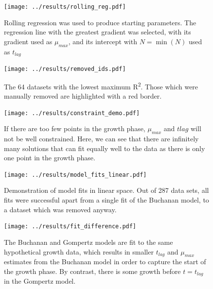 \documentclass[11pt, a4paper]{article}
\begin{document}
        
        \begin{figure}[H]
        \centering
        \texttt{[image: ../results/rolling\_reg.pdf]}
        \caption{Rolling regression was used to produce starting parameters. The regression line with the greatest gradient was selected, with its gradient used as $\mu_{max}$, and its intercept with $N = \min(N)$ used as $t_{lag}$ }
        \label{sup:rolling_regression}
        \end{figure}  
        
        
         \begin{figure}[H]
        \texttt{[image: ../results/removed\_ids.pdf]}
        \caption{The 64 datasets with the lowest maximum R\textsuperscript{2}. Those which were manually removed are highlighted with a red border.}
        \label{sup:removed_ids}
        \end{figure}
        
                 \begin{figure}[H]
        \texttt{[image: ../results/constraint\_demo.pdf]}
        \centering
        \caption{If there are too few points in the growth phase, $\mu_{max}$ and $t{lag}$ will not be well constrained. Here, we can see that there are infinitely many solutions that can fit equally well to the data as there is only one point in the growth phase. }
        \label{sup:constraint}
        \end{figure}  


                \begin{figure}[H]
                \centering
        \texttt{[image: ../results/model\_fits\_linear.pdf]}
        \caption{Demonstration of model fits in linear space. Out of 287 data sets, all fits were successful apart from a single fit of the Buchanan model, to a dataset which was removed anyway.}
        \label{sup:model_fits_linear}
        \end{figure}

         \begin{figure}[H]
        \texttt{[image: ../results/fit\_difference.pdf]}
        \centering
        \caption{The Buchanan and Gompertz models are fit to the same hypothetical growth data, which results in smaller $t_{lag}$ and $\mu_{max}$ estimates from the Buchanan model in order to capture the start of the growth phase. By contrast, there is some growth before $t = t_{lag}$ in the Gompertz model.}
        \label{sup:fit_difference}
        \end{figure} 
        
\end{document}
